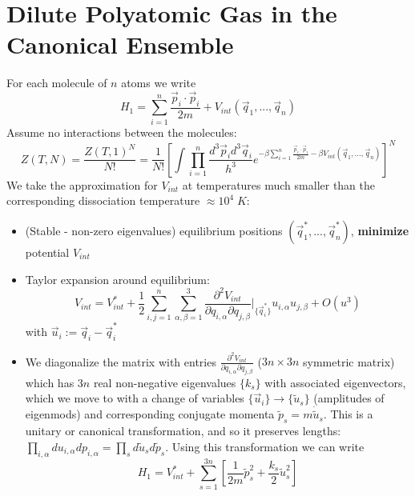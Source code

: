 \documentclass[12pt, a4paper, oneside, openright, titlepage]{book}
\begin{document}
\section{Dilute Polyatomic Gas in the Canonical Ensemble}

For each molecule of $n$ atoms we write \begin{equation*}
    H_1 = \sum_{i=1}^n\frac{\vec{p}_i\cdot\vec{p}_i}{2m}+V_{int}(\vec{q}_1,...,\vec{q}_n)
\end{equation*}
Assume no interactions between the molecules: \begin{equation*}
    Z(T,N) = \frac{Z(T,1)^N}{N!} = \frac{1}{N!}\left[\int\prod_{i=1}^n\frac{d^3\vec{p}_id^3\vec{q}_i}{h^3}e^{-\beta\sum_{i=1}^n\frac{\vec{p}_i\cdot\vec{p}_i}{2m}-\beta V_{int}(\vec{q}_1,...,\vec{q}_n)}\right]^N
\end{equation*}
We take the approximation for $V_{int}$ at temperatures much smaller than the corresponding dissociation temperature $\approx 10^4\;K$: \begin{itemize}
    \item (Stable - non-zero eigenvalues) equilibrium positions $(\vec{q}_1^*,...,\vec{q}_n^*)$, \textbf{minimize} potential $V_{int}$ 
    \item Taylor expansion around equilibrium: \begin{equation*}
            V_{int} = V_{int}^* + \frac{1}{2}\sum_{i,j=1}^n\sum_{\alpha,\beta=1}^3\frac{\partial^2V_{int}}{\partial q_{i,\alpha}\partial q_{j,\beta}}\Bigg\rvert_{\{\vec{q}_i^*\}}u_{i,\alpha}u_{j,\beta} + O(u^3)
    \end{equation*}
        with $\vec{u}_i := \vec{q}_i-\vec{q}_i^*$
    \item We diagonalize the matrix with entries $\frac{\partial^2V_{int}}{\partial q_{i,\alpha}\partial q_{j,\beta}}$ ($3n\times 3n$ symmetric matrix) which has $3n$ real non-negative eigenvalues $\{k_s\}$ with associated eigenvectors, which we move to with a change of variables $\{\vec{u}_i\}\rightarrow \{\tilde{u}_s\}$ (amplitudes of eigenmods) and corresponding conjugate momenta $\tilde{p}_s = m\dot{\tilde{u}}_s$. This is a unitary or canonical transformation, and so it preserves lengths: $\prod_{i,\alpha}du_{i,\alpha}dp_{i,\alpha} = \prod_sd\tilde{u}_sd\tilde{p}_s$. Using this transformation we can write \begin{equation*}
            H_1 = V_{int}^* + \sum_{s=1}^{3n}\left[\frac{1}{2m}\tilde{p}_s^2 + \frac{k_s}{2}\tilde{u}_s^2\right]
    \end{equation*}
\end{itemize}
\end{document}
